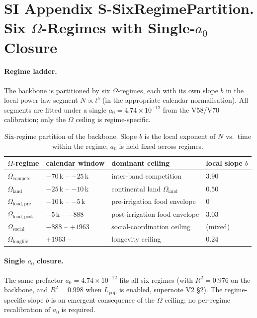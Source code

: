 \documentclass[11pt]{article}
\begin{document}
\section*{SI Appendix S-SixRegimePartition. Six $\Omega$-Regimes with Single-$a_0$ Closure}
\label{sec:S-SixRegimePartition}

\paragraph{Regime ladder.} The backbone is partitioned by six $\Omega$-regimes, each with its own slope $b$ in the local power-law segment $N\propto t^{b}$ (in the appropriate calendar normalisation). All segments are fitted under a single $a_{0}=4.74\times 10^{-12}$ from the V58/V70 calibration; only the $\Omega$ ceiling is regime-specific.

\begin{table}[htbp]
\centering
\caption{Six-regime partition of the backbone. Slope $b$ is the local exponent of $N$ vs.\ time within the regime; $a_{0}$ is held fixed across regimes.}\label{tab:S-SixRegime}
\begin{tabular}{llll}
\toprule
$\Omega$-regime & calendar window & dominant ceiling & local slope $b$ \\
\midrule
$\Omega_{\mathrm{compete}}$    & $-70$\,k -- $-25$\,k & inter-band competition         & $3.90$ \\
$\Omega_{\mathrm{land}}$       & $-25$\,k -- $-10$\,k & continental land $\Omega_{\mathrm{land}}$ & $0.50$ \\
$\Omega_{\mathrm{food,pre}}$   & $-10$\,k -- $-5$\,k  & pre-irrigation food envelope    & $0$    \\
$\Omega_{\mathrm{food,post}}$  & $-5$\,k -- $-888$    & post-irrigation food envelope   & $3.03$ \\
$\Omega_{\mathrm{social}}$     & $-888$ -- $+1963$    & social-coordination ceiling     & (mixed)\\
$\Omega_{\mathrm{longlife}}$   & $+1963$ --           & longevity ceiling               & $0.24$ \\
\bottomrule
\end{tabular}
\end{table}

\paragraph{Single $a_{0}$ closure.} The same prefactor $a_{0}=4.74\times 10^{-12}$ fits all six regimes (with $R^{2}=0.976$ on the backbone, and $R^{2}=0.998$ when $L_{\mathrm{pop}}$ is enabled, supernote V2 \S2). The regime-specific slope $b$ is an emergent consequence of the $\Omega$ ceiling; no per-regime recalibration of $a_{0}$ is required.
\end{document}
